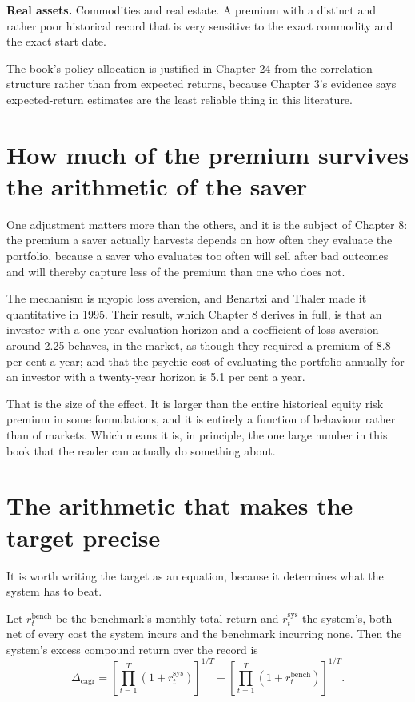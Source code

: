 \textbf{Real assets.} Commodities and real estate. A premium with a
distinct and rather poor historical record that is very sensitive to the
exact commodity and the exact start date.

The book's policy allocation is justified in Chapter 24 from the correlation
structure rather than from expected returns, because Chapter 3's evidence
says expected-return estimates are the least reliable thing in this
literature.

\section{How much of the premium survives the arithmetic of the saver}

One adjustment matters more than the others, and it is the subject of
Chapter 8: the premium a saver actually harvests depends on how often they
evaluate the portfolio, because a saver who evaluates too often will sell
after bad outcomes and will thereby capture less of the premium than one
who does not.

The mechanism is myopic loss aversion, and Benartzi and Thaler made it
quantitative in 1995. Their result, which Chapter 8 derives in full, is
that an investor with a one-year evaluation horizon and a coefficient of
loss aversion around 2.25 behaves, in the market, as though they required
a premium of 8.8 per cent a year; and that the psychic cost of evaluating
the portfolio annually for an investor with a twenty-year horizon is 5.1
per cent a year.

That is the size of the effect. It is larger than the entire historical
equity risk premium in some formulations, and it is entirely a function of
behaviour rather than of markets. Which means it is, in principle, the
one large number in this book that the reader can actually do something
about.

\section{The arithmetic that makes the target precise}

It is worth writing the target as an equation, because it determines what
the system has to beat.

Let \(r_t^{\mathrm{bench}}\) be the benchmark's monthly total return and
\(r_t^{\mathrm{sys}}\) the system's, both net of every cost the system
incurs and the benchmark incurring none. Then the system's excess
compound return over the record is
\begin{equation}
\Delta_{\mathrm{cagr}}
 = \left[\prod_{t=1}^{T}\left(1+r_t^{\mathrm{sys}}\right)\right]^{1/T}
 - \left[\prod_{t=1}^{T}\left(1+r_t^{\mathrm{bench}}\right)\right]^{1/T}.
\end{equation}

